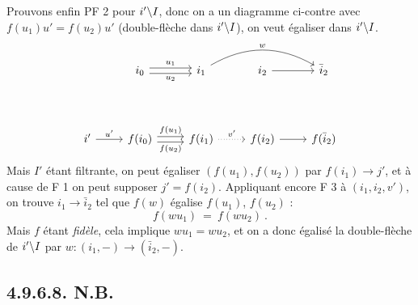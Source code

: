 Prouvons enfin PF 2 pour $i'\backslash I$, donc on a un diagramme ci-contre avec $f(u_1)u' = f(u_2)u'$ (double-flèche dans $i'\backslash I$), on veut égaliser dans $i'\backslash I$.
\[
\begin{tikzcd}
{} & i_0 \arrow[r, shift left, "u_1"] \arrow[r, shift right, "u_2"'] & i_1 \arrow[rr, bend left, "w"] & i_2 \arrow[r] & \bar{i}_2 \\
{} & {} & {} & {} & {} \\
i' \arrow[r, "u'"] & f(i_0) \arrow[r, shift left, "f(u_1)"] \arrow[r, shift right, "f(u_2)"'] & f(i_1) \arrow[r, dotted, "v'"] & f(i_2) \arrow[r] & f(\bar{i}_2)
\end{tikzcd}
\]
Mais $I'$ étant filtrante, on peut égaliser $(f(u_1), f(u_2))$ par $f(i_1) \longrightarrow j'$, et à cause de F 1 on peut supposer $j' = f(i_2)$. Appliquant encore F 3 à $(i_1, i_2, v')$, on trouve $i_1 \longrightarrow \bar{i}_2$ tel que $f(w)$ égalise $f(u_1)$, $f(u_2)$ :
\[
f(wu_1) \ = \ f(wu_2) \ .
\]
Mais $f$ étant \textit{fidèle}, cela implique $wu_1 = wu_2$, et on a donc égalisé la double-flèche de $i'\backslash I$ par $w : (i_1, -) \longrightarrow (\bar{i}_2, -)$.

\subsection*{4.9.6.8. N.B.}

